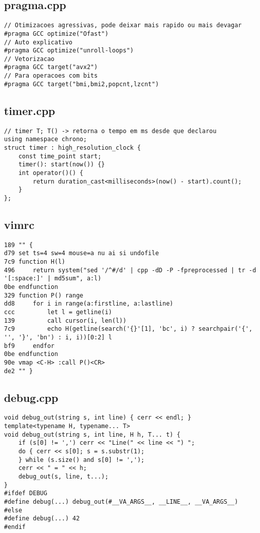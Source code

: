 \documentclass[11pt, a4paper, twoside]{article}
\begin{document}
\subsection{pragma.cpp}
\begin{lstlisting}
// Otimizacoes agressivas, pode deixar mais rapido ou mais devagar
#pragma GCC optimize("Ofast")
// Auto explicativo
#pragma GCC optimize("unroll-loops")
// Vetorizacao
#pragma GCC target("avx2")
// Para operacoes com bits
#pragma GCC target("bmi,bmi2,popcnt,lzcnt")
\end{lstlisting}

\subsection{timer.cpp}
\begin{lstlisting}
// timer T; T() -> retorna o tempo em ms desde que declarou
using namespace chrono;
struct timer : high_resolution_clock {
	const time_point start;
	timer(): start(now()) {}
	int operator()() {
		return duration_cast<milliseconds>(now() - start).count();
	}
};
\end{lstlisting}

\subsection{vimrc}
\begin{lstlisting}
189 "" {
d79 set ts=4 sw=4 mouse=a nu ai si undofile
7c9 function H(l)
496 	return system("sed '/^#/d' | cpp -dD -P -fpreprocessed | tr -d '[:space:]' | md5sum", a:l)
0be endfunction
329 function P() range
dd8 	for i in range(a:firstline, a:lastline)
ccc 		let l = getline(i)
139 		call cursor(i, len(l))
7c9 		echo H(getline(search('{}'[1], 'bc', i) ? searchpair('{', '', '}', 'bn') : i, i))[0:2] l
bf9 	endfor
0be endfunction
90e vmap <C-H> :call P()<CR>
de2 "" }
\end{lstlisting}

\subsection{debug.cpp}
\begin{lstlisting}
void debug_out(string s, int line) { cerr << endl; }
template<typename H, typename... T>
void debug_out(string s, int line, H h, T... t) {
    if (s[0] != ',') cerr << "Line(" << line << ") ";
    do { cerr << s[0]; s = s.substr(1);
    } while (s.size() and s[0] != ',');
    cerr << " = " << h;
    debug_out(s, line, t...);
}
#ifdef DEBUG
#define debug(...) debug_out(#__VA_ARGS__, __LINE__, __VA_ARGS__)
#else
#define debug(...) 42
#endif
\end{lstlisting}
\end{document}
